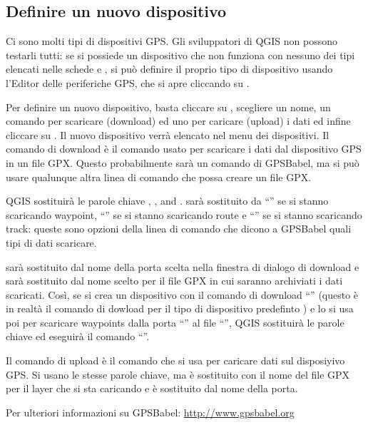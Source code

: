 \subsection{Definire un nuovo dispositivo}\label{sec:Defining-new-device}

Ci sono molti tipi di dispositivi GPS. Gli sviluppatori di QGIS non possono testarli tutti: se si 
possiede un dispositivo che non funziona con nessuno dei tipi elencati nelle schede 
 e , si può definire il proprio tipo di dispositivo usando 
l'Editor delle periferiche GPS, che si apre cliccando su .

Per definire un nuovo dispositivo, basta cliccare su , scegliere un nome, un comando per scaricare 
(download) ed uno per caricare (upload) i dati ed infine cliccare su .
Il nuovo dispositivo verrà elencato nel menu dei dispositivi.
Il comando di download è il comando usato per scaricare i dati dal dispositivo GPS in un file GPX.
Questo probabilmente sarà un comando di GPSBabel, ma si può usare qualunque altra linea di comando che 
possa creare un file GPX. 

QGIS sostituirà le parole chiave , , and .  sarà 
sostituito da {}``'' se si stanno scaricando waypoint, {}``'' se si stanno scaricando route 
e {}``'' se si stanno scaricando track: queste sono opzioni della linea di comando che dicono a 
GPSBabel quali tipi di dati scaricare.

 sarà sostituito dal nome della porta scelta nella finestra di dialogo di download e 
 sarà sostituito dal nome scelto per il file GPX in cui saranno archiviati i dati scaricati.
Così, se si crea un dispositivo con il comando di download {}``'' 
(questo è in realtà il comando di dowload per il tipo di dispositivo predefinto ) 
e lo si usa poi per scaricare waypoints dalla porta {}``'' al file {}``'', 
QGIS sostituirà le parole chiave ed eseguirà il comando {}``''.

Il comando di upload è il comando che si usa per caricare dati sul disposiyivo GPS.
Si usano le stesse parole chiave, ma  è sostituito con il nome del file GPX per il layer che si sta caricando 
e  è sostituito dal nome della porta.

Per ulteriori informazioni su GPSBabel: \url{http://www.gpsbabel.org}

\FloatBarrier